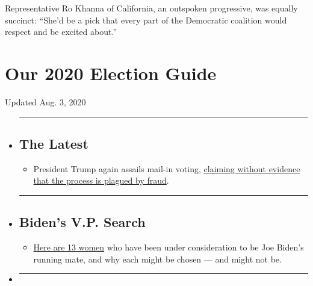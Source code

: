 Representative Ro Khanna of California, an outspoken progressive, was
equally succinct: ``She'd be a pick that every part of the Democratic
coalition would respect and be excited about.''

\hypertarget{our-2020-election-guide}{%
\section{Our 2020 Election Guide}\label{our-2020-election-guide}}

Updated Aug. 3, 2020

\begin{itemize}
\item
  \begin{center}\rule{0.5\linewidth}{\linethickness}\end{center}

  \hypertarget{the-latest}{%
  \subsection{The Latest}\label{the-latest}}

  \begin{itemize}
  \tightlist
  \item
    President Trump again assails mail-in voting,
    \href{https://www.nytimes3xbfgragh.onion/2020/08/03/us/politics/trump-mail-in-voting.html?action=click\&pgtype=Article\&state=default\&region=BELOW_MAIN_CONTENT\&context=storylines_guide}{claiming
    without evidence that the process is plagued by fraud}.
  \end{itemize}
\item
  \begin{center}\rule{0.5\linewidth}{\linethickness}\end{center}

  \hypertarget{bidens-vp-search}{%
  \subsection{Biden's V.P. Search}\label{bidens-vp-search}}

  \begin{itemize}
  \tightlist
  \item
    \href{https://www.nytimes3xbfgragh.onion/article/biden-vice-president-2020.html?action=click\&pgtype=Article\&state=default\&region=BELOW_MAIN_CONTENT\&context=storylines_guide}{Here
    are 13 women} who have been under consideration to be Joe Biden's
    running mate, and why each might be chosen --- and might not be.
  \end{itemize}
\item
  \begin{center}\rule{0.5\linewidth}{\linethickness}\end{center}


\end{itemize}
